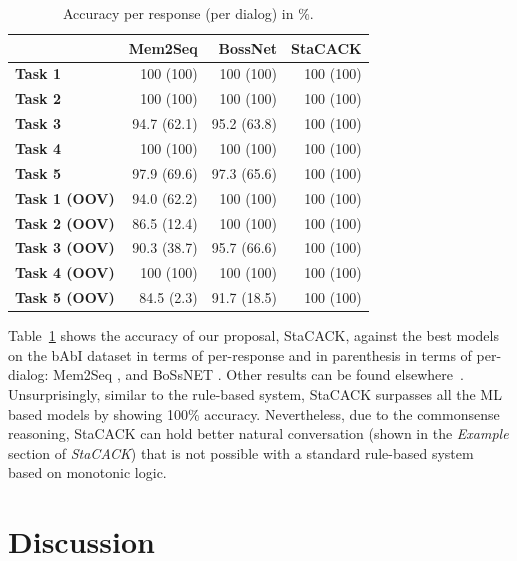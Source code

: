 \documentclass[letterpaper]{article}
\begin{document}
\begin{table}
\centering
\scriptsize
\setlength{\tabcolsep}{0.72em}
\begin{tabular}{|l|*{3}{r|}}
\hline
&  \textbf{Mem2Seq}
& \textbf{BossNet}
& \textbf{StaCACK}
\\[.82em]
\hline\hline
\textbf{Task 1}  & 100 (100) & 100 (100)  & 100 (100) \\\hline
\textbf{Task 2}  & 100 (100) & 100 (100)  & 100 (100) \\\hline
\textbf{Task 3}  & 94.7 (62.1) & 95.2 (63.8)  & 100 (100) \\\hline
\textbf{Task 4}  & 100 (100) & 100 (100)  & 100 (100) \\\hline
\textbf{Task 5}  & 97.9 (69.6) & 97.3 (65.6)  & 100 (100) \\\hline
\textbf{Task 1 (OOV)} & 94.0 (62.2) & 100 (100)   & 100 (100)\\\hline
\textbf{Task 2 (OOV)} & 86.5 (12.4)  & 100 (100) & 100 (100) \\\hline
\textbf{Task 3 (OOV)} & 90.3 (38.7) & 95.7 (66.6)  & 100 (100) \\\hline
\textbf{Task 4 (OOV)} & 100 (100) & 100 (100) & 100 (100) \\\hline
\textbf{Task 5 (OOV)} & 84.5 (2.3) & 91.7 (18.5)  & 100 (100) \\\hline

\end{tabular}

\vspace{-2.93mm}
\caption{Accuracy per response (per dialog) in \%.}
\label{table:Stacack_compare}
\end{table}


Table~\ref{table:Stacack_compare} shows the accuracy of our proposal,
StaCACK, against the best models on the bAbI dataset in terms of
per-response and in parenthesis in terms of per-dialog: Mem2Seq
\cite{mem2seq}, and BoSsNET \cite{bossnet}. Other results can be found
elsewhere~\cite{babi_dialog}.
Unsurprisingly, similar to the rule-based system, StaCACK surpasses
all the ML based models by showing 100\% accuracy. Nevertheless, due
to the commonsense reasoning, StaCACK can hold better natural
conversation (shown in the \textit{Example} section of
\textit{StaCACK}) that is not possible with a standard rule-based
system based on monotonic logic.


\vspace{-2.91mm}
\section{Discussion}
\end{document}
